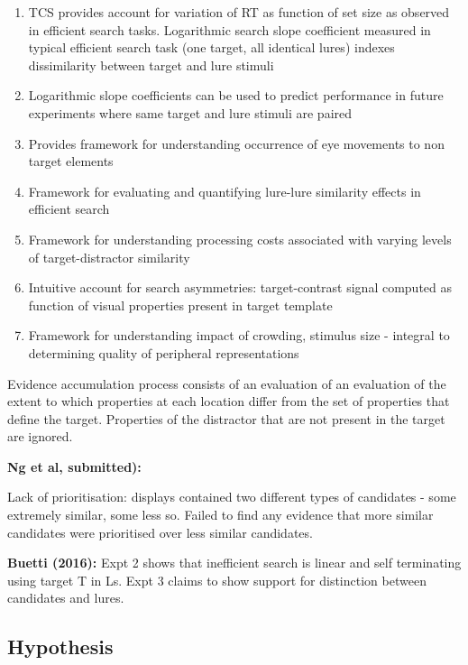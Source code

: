 \begin{enumerate}
\item TCS provides account for variation of RT as function of set size as observed in efficient search tasks. Logarithmic search slope coefficient measured in typical efficient search task (one target, all identical lures) indexes dissimilarity between target and lure stimuli \\
\item Logarithmic slope coefficients can be used to predict performance in future experiments where same target and lure stimuli are paired \\
\item Provides framework for understanding occurrence of eye movements to non target elements \\
\item Framework for evaluating and quantifying lure-lure similarity effects in efficient search \\
\item Framework for understanding processing costs associated with varying levels of target-distractor similarity \\
\item Intuitive account for search asymmetries: target-contrast signal computed as function of visual properties present in target template \\
\item Framework for understanding impact of crowding, stimulus size - integral to determining quality of peripheral representations \\
\end{enumerate}

Evidence accumulation process consists of an evaluation of an evaluation of the extent to which properties at each location differ from the set of properties that define the target. Properties of the distractor that are not present in the target are ignored.

\textbf{Ng et al, submitted):}

Lack of prioritisation: displays contained two different types of candidates - some extremely similar, some less so. Failed to find any evidence that more similar candidates were prioritised over less similar candidates.

\textbf{Buetti (2016):}
Expt 2 shows that inefficient search is linear and self terminating using target T in Ls. 
Expt 3 claims to show support for distinction between candidates and lures.

\subsection{Hypothesis}

